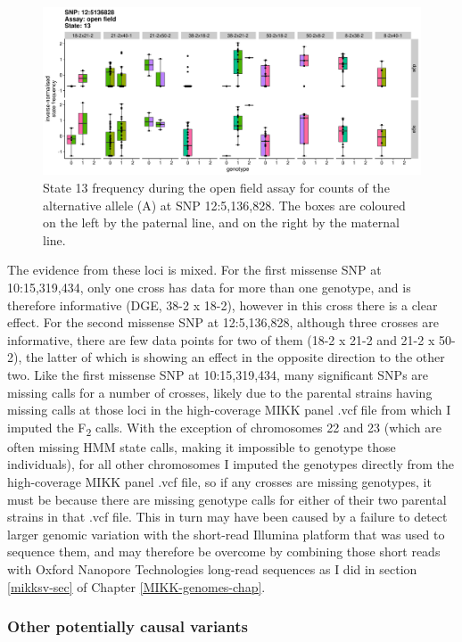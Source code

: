 \documentclass[
]{book}
\begin{document}
\begin{figure}
\includegraphics[width=1\linewidth]{figs/mikk_behaviour/sig_snps_boxplots/13-12:5136828} \caption{State 13 frequency during the open field assay for counts of the alternative allele (A) at SNP 12:5,136,828. The boxes are coloured on the left by the paternal line, and on the right by the maternal line.}\label{fig:sig-snp-12-5mb}
\end{figure}

The evidence from these loci is mixed. For the first missense SNP at 10:15,319,434, only one cross has data for more than one genotype, and is therefore informative (DGE, 38-2 x 18-2), however in this cross there is a clear effect. For the second missense SNP at 12:5,136,828, although three crosses are informative, there are few data points for two of them (18-2 x 21-2 and 21-2 x 50-2), the latter of which is showing an effect in the opposite direction to the other two. Like the first missense SNP at 10:15,319,434, many significant SNPs are missing calls for a number of crosses, likely due to the parental strains having missing calls at those loci in the high-coverage MIKK panel .vcf file from which I imputed the F\textsubscript{2} calls. With the exception of chromosomes 22 and 23 (which are often missing HMM state calls, making it impossible to genotype those individuals), for all other chromosomes I imputed the genotypes directly from the high-coverage MIKK panel .vcf file, so if any crosses are missing genotypes, it must be because there are missing genotype calls for either of their two parental strains in that .vcf file. This in turn may have been caused by a failure to detect larger genomic variation with the short-read Illumina platform that was used to sequence them, and may therefore be overcome by combining those short reads with Oxford Nanopore Technologies long-read sequences as I did in section \ref{mikksv-sec} of Chapter \ref{MIKK-genomes-chap}.

\hypertarget{other-potentially-causal-variants}{%
\subsubsection{Other potentially causal variants}\label{other-potentially-causal-variants}}
\end{document}
